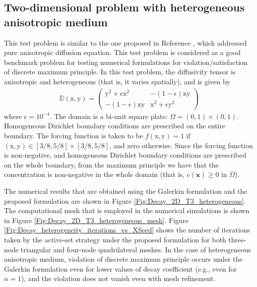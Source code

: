 \documentclass[11pt]{amsart}
\begin{document}
\subsection{Two-dimensional problem with heterogeneous anisotropic medium}
This test problem is similar to the one proposed in Reference \cite{LePotier_CRM_2005_v341_p787}, 
which addressed pure anisotropic diffusion equation. This test problem is considered as 
a good benchmark problem for testing numerical formulations for violation/satisfaction 
of discrete maximum principle. In this test problem, the diffusivity tensor is anisotropic 
and heterogeneous (that is, it varies spatially), and is given by
\begin{align}
  \label{Eqn:Decay_diffusivity_tensor_heterogeneous}
  \mathbb{D}(\mathrm{x},\mathrm{y}) = 
  \left(\begin{array}{cc}
      \mathrm{y}^{2} + \epsilon \mathrm{x}^{2} & -(1-\epsilon) \mathrm{x} \mathrm{y}\\ 
      -(1-\epsilon) \mathrm{x} \mathrm{y} & \mathrm{x}^{2} + \epsilon \mathrm{y}^2 
    \end{array}\right)
\end{align}
where $\epsilon = 10^{-4}$. The domain is a bi-unit square plate: $\Omega = (0,1) \times (0,1)$. 
Homogeneous Dirichlet boundary conditions are prescribed on the entire boundary. The forcing 
function is taken to be $f(\mathrm{x},\mathrm{y}) = 1$ if $(\mathrm{x}, \mathrm{y}) \in 
[3/8,5/8] \times [3/8,5/8]$, and zero otherwise. Since the forcing function is non-negative, 
and homogeneous Dirichlet boundary conditions are prescribed on the whole boundary, from the 
maximum principle we have that the concentration is non-negative in the whole domain (that is, 
$c(\mathbf{x}) \geq 0$ in $\bar{\Omega}$). 

The numerical results that are obtained using the Galerkin formulation and the proposed formulation 
are shown in Figure \ref{Fig:Decay_2D_T3_heterogeneous}. The computational mesh that is employed in 
the numerical simulations is shown in Figure \ref{Fig:Decay_2D_T3_heterogeneous_mesh}. Figure 
\ref{Fig:Decay_heterogeneity_iterations_vs_XSeed} shows the number of iterations taken by the 
active-set strategy under the proposed formulation for both three-node triangular and four-node 
quadrilateral meshes. In the case of heterogeneous anisotropic medium, violation of discrete 
maximum principle occurs under the Galerkin formulation even for lower values of decay coefficient 
(e.g., even for $\alpha = 1$), and the violation does not vanish even with mesh refinement.
\end{document}
